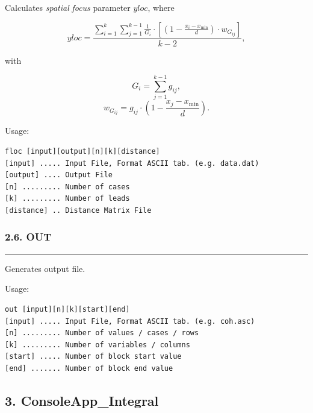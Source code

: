 \documentclass[
]{article}
\begin{document}
Calculates \emph{spatial} \emph{focus} parameter \(yloc\), where

\[yloc = \frac{\sum_{i = 1}^{k}{\sum_{j = 1}^{k - 1}{\frac{1}{G_{i}} \cdot \left\lbrack \left( 1 - \frac{x_{i} - x_{\min}}{d} \right) \cdot w_{G_{ij}} \right\rbrack}}}{k - 2},\]

with

\[G_{i} = \sum_{j = 1}^{k - 1}g_{ij},\]
\[w_{G_{ij}} = g_{ij} \cdot \left( 1 - \frac{x_{j} - x_{\min}}{d} \right).\]

Usage:

\begin{verbatim}
floc [input][output][n][k][distance]
[input] ..... Input File, Format ASCII tab. (e.g. data.dat)
[output] .... Output File
[n] ......... Number of cases
[k] ......... Number of leads
[distance] .. Distance Matrix File
\end{verbatim}

\hypertarget{out}{%
\subsubsection{2.6. OUT}\label{out}}

\begin{center}\rule{0.5\linewidth}{0.5pt}\end{center}

Generates output file.

Usage:

\begin{verbatim}
out [input][n][k][start][end] 
[input] ..... Input File, Format ASCII tab. (e.g. coh.asc)
[n] ......... Number of values / cases / rows
[k] ......... Number of variables / columns 
[start] ..... Number of block start value 
[end] ....... Number of block end value
\end{verbatim}

\hypertarget{consoleapp_integral}{%
\subsection{3. ConsoleApp\_Integral}\label{consoleapp_integral}}
\end{document}
